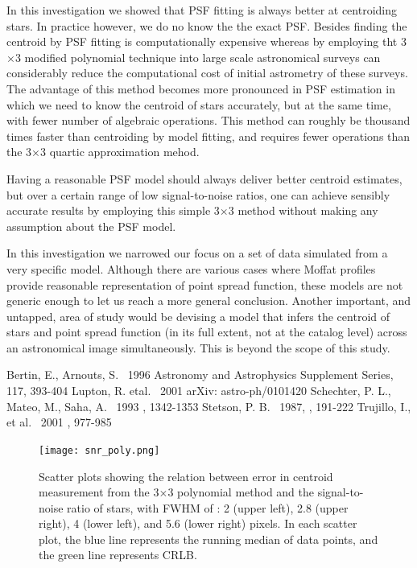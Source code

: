 \documentclass[12pt, preprint]{aastex}
\begin{document}
In this investigation we showed that PSF fitting is always better at centroiding stars.
In practice however, we do no know the the exact PSF. Besides finding the centroid by PSF
fitting is computationally expensive whereas by employing tht 3$\times$3 modified polynomial
technique into large scale astronomical surveys can considerably reduce the computational cost
of initial astrometry of these surveys. The advantage of this method becomes more pronounced
in PSF estimation in which we need to know the centroid of stars accurately, but at the
same time, with fewer number of algebraic operations. This method can roughly be thousand
times faster than centroiding by model fitting, and requires fewer operations than the
3$\times$3 quartic approximation mehod.
     
Having a reasonable PSF model should always deliver better centroid estimates, but
over a certain range of low signal-to-noise ratios, one can achieve sensibly accurate
results by employing this simple 3$\times$3 method without making any assumption about
the PSF model.

In this investigation we narrowed our focus on a set of data simulated from a very specific
model. Although there are various cases where Moffat profiles provide reasonable
representation of point spread function, these models are not generic enough to let us
reach a more general conclusion. Another important, and untapped, area of study
would be devising a model that infers the centroid of stars and point spread function
(in its full extent, not at the catalog level) across an astronomical image simultaneously.
This is beyond the scope of this study. 

\begin{thebibliography}{70}

 Bertin, E., Arnouts, S. \ 1996  Astronomy and Astrophysics Supplement Series, 117, 393-404
 Lupton, R. etal. \ 2001  arXiv: astro-ph/0101420
 Schechter, P. L., Mateo, M., Saha, A. \ 1993 \pasp, 1342-1353
 Stetson, P. B. \ 1987, \pasp, 191-222
 Trujillo, I., et al. \ 2001 \mnras, 977-985

\end{thebibliography}

\clearpage


\begin{figure}[!htb]
  \texttt{[image: snr\_poly.png]}
\endminipage
\caption{Scatter plots showing the relation between error in centroid measurement from the 3$\times$3 polynomial method and the signal-to-noise ratio of stars, with FWHM of : 2 (upper left), 2.8 (upper right), 4 (lower left), and 5.6 (lower right) pixels. In each scatter plot, the blue line represents the running median of data points, and the green line represents CRLB.}\label{1}
\end{figure}
\end{document}
